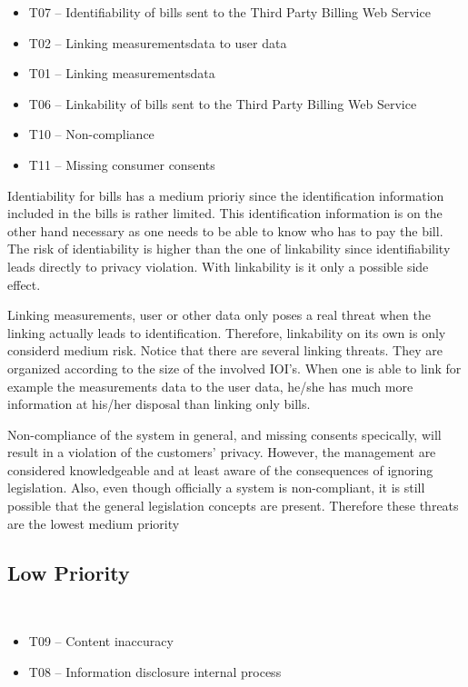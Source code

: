 \begin{itemize}
  \item T07 -- Identifiability of bills sent to the Third Party Billing
  Web Service
  \item T02 -- Linking measurementsdata to user data
  \item T01 -- Linking measurementsdata
  \item T06 -- Linkability of bills sent to the Third Party Billing Web
  Service 
  \item T10 -- Non-compliance
  \item T11 -- Missing consumer consents
\end{itemize}

\npar Identiability for bills has a medium prioriy since the identification
information included in the bills is rather limited. This identification
information is on the other hand necessary as one needs to be able to know who
has to pay the bill. The risk of identiability is higher than the one of
linkability since identifiability leads directly to privacy violation. With
linkability is it only a possible side effect.

\npar Linking measurements, user or other data only poses a real threat when the
linking actually leads to identification. Therefore, linkability on its own is
only considerd medium risk. Notice that there are several linking threats. They
are organized according to the size of the involved IOI's. When one is able to
link for example the measurements data to the user data, he/she has much more
information at his/her disposal than linking only bills.

\npar Non-compliance of the system in general, and missing consents specically,
will result in a violation of the customers' privacy. However, the management
are considered knowledgeable and at least aware of the consequences of ignoring
legislation. Also, even though officially a system is non-compliant, it is still
possible that the general legislation concepts are present. Therefore these
threats are the lowest medium priority

\subsection{Low Priority}

\ %

\begin{itemize}
  \item T09 -- Content inaccuracy
  \item T08 -- Information disclosure internal process
\end{itemize}

